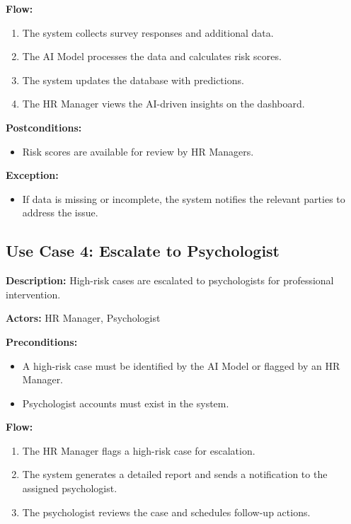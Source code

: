 \documentclass[conference]{IEEEtran}
\begin{document}
        \textbf{Flow:}
        \begin{enumerate}
            \item The system collects survey responses and additional data.
            \item The AI Model processes the data and calculates risk scores.
            \item The system updates the database with predictions.
            \item The HR Manager views the AI-driven insights on the dashboard.
        \end{enumerate}
        
        \textbf{Postconditions:}
        \begin{itemize}
            \item Risk scores are available for review by HR Managers.
        \end{itemize}
        
        \textbf{Exception:}
        \begin{itemize}
            \item If data is missing or incomplete, the system notifies the relevant parties to address the issue.
        \end{itemize}
        
        \subsection{Use Case 4: Escalate to Psychologist}
        
        \textbf{Description:} High-risk cases are escalated to psychologists for professional intervention.
        
        \textbf{Actors:} HR Manager, Psychologist
        
        \textbf{Preconditions:}
        \begin{itemize}
            \item A high-risk case must be identified by the AI Model or flagged by an HR Manager.
            \item Psychologist accounts must exist in the system.
        \end{itemize}
        
        \textbf{Flow:}
        \begin{enumerate}
            \item The HR Manager flags a high-risk case for escalation.
            \item The system generates a detailed report and sends a notification to the assigned psychologist.
            \item The psychologist reviews the case and schedules follow-up actions.
        \end{enumerate}
        
\end{document}
